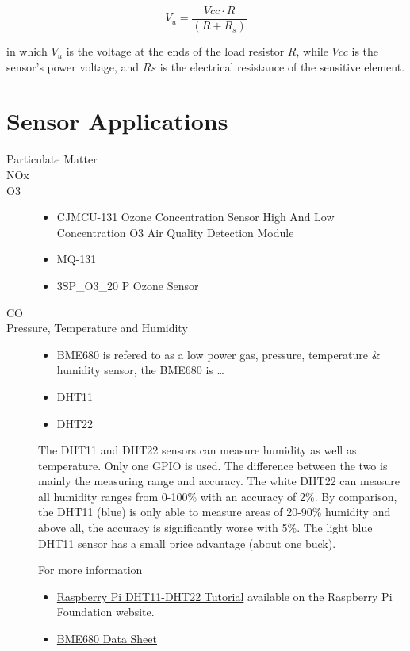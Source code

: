 \documentclass{article}\usepackage[]{graphicx}\usepackage[]{color}
\begin{document}
\begin{equation} 
V_u = \frac{Vcc \cdot R}{(R+R_s)}
\end{equation}
 
in which $V_u$ is the voltage at the ends of the load resistor $R$, while $Vcc$ is the sensor's power voltage, and $Rs$ is the electrical resistance of the sensitive element.

\section{Sensor Applications}

\begin{description}

\item[Particulate Matter]

\item[NOx]

\item[O3]

\begin{itemize}
  \item CJMCU-131 Ozone Concentration Sensor High And Low Concentration O3 Air Quality Detection Module
  \item MQ-131
  \item 3SP\_O3\_20 P Ozone Sensor
\end{itemize}

\item[CO]

\item[Pressure, Temperature and Humidity]

\begin{itemize}
  \item BME680 is refered to as a low power gas, pressure, temperature \& humidity sensor, the BME680 is \ldots
  \item DHT11
  \item DHT22
\end{itemize}

The DHT11 and DHT22 sensors can measure humidity as well as temperature. Only one GPIO is used. The difference between the two is mainly the measuring range and accuracy. The white DHT22 can measure all humidity ranges from 0-100\% with an accuracy of 2\%. By comparison, the DHT11 (blue) is only able to measure areas of 20-90\% humidity and above all, the accuracy is significantly worse with 5\%. The light blue DHT11 sensor has a small price advantage (about one buck).

For more information

\begin{itemize}
  \item \href{https://tutorials-raspberrypi.com/raspberry-pi-measure-humidity-temperature-dht11-dht22/}{Raspberry Pi DHT11-DHT22 Tutorial} available on the Raspberry Pi Foundation website.
  \item \href{https://cdn-shop.adafruit.com/product-files/3660/BME680.pdf}{BME680 Data Sheet}
\end{itemize}


\end{description}
\end{document}
